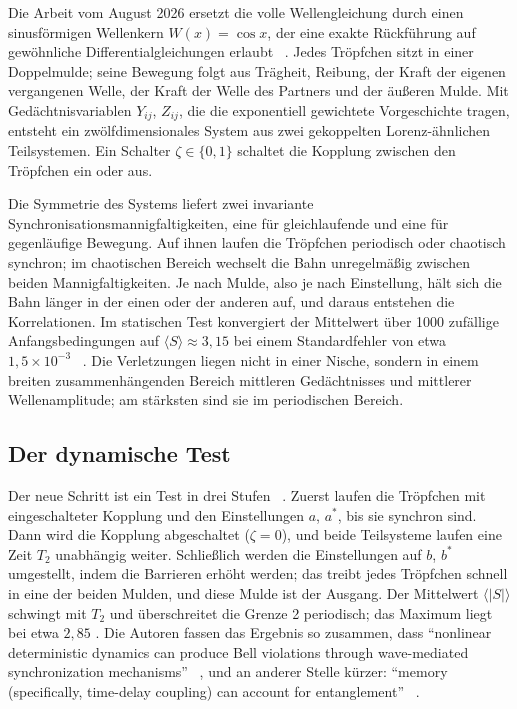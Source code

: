 Die Arbeit vom August 2026 ersetzt die volle Wellengleichung durch einen sinusförmigen Wellenkern
$W(x)=\cos x$, der eine exakte Rückführung auf gewöhnliche Differentialgleichungen erlaubt
\QM~\cite{Lopez2026}. Jedes Tröpfchen sitzt in einer Doppelmulde; seine Bewegung folgt aus Trägheit,
Reibung, der Kraft der eigenen vergangenen Welle, der Kraft der Welle des Partners und der äußeren
Mulde. Mit Gedächtnisvariablen $Y_{ij}$, $Z_{ij}$, die die exponentiell gewichtete Vorgeschichte
tragen, entsteht ein zwölfdimensionales System aus zwei gekoppelten Lorenz-ähnlichen Teilsystemen.
Ein Schalter $\zeta\in\{0,1\}$ schaltet die Kopplung zwischen den Tröpfchen ein oder aus.

Die Symmetrie des Systems liefert zwei invariante Synchronisationsmannigfaltigkeiten, eine für
gleichlaufende und eine für gegenläufige Bewegung. Auf ihnen laufen die Tröpfchen periodisch oder
chaotisch synchron; im chaotischen Bereich wechselt die Bahn unregelmäßig zwischen beiden
Mannigfaltigkeiten. Je nach Mulde, also je nach Einstellung, hält sich die Bahn länger in der einen
oder der anderen auf, und daraus entstehen die Korrelationen. Im statischen Test konvergiert der
Mittelwert über 1000 zufällige Anfangsbedingungen auf $\langle S\rangle\approx3{,}15$ bei einem
Standardfehler von etwa $1{,}5\times10^{-3}$ \QM~\cite{Lopez2026}. Die Verletzungen liegen nicht in
einer Nische, sondern in einem breiten zusammenhängenden Bereich mittleren Gedächtnisses und
mittlerer Wellenamplitude; am stärksten sind sie im periodischen Bereich.

\subsection{Der dynamische Test}

Der neue Schritt ist ein Test in drei Stufen \QM~\cite{Lopez2026}. Zuerst laufen die Tröpfchen mit
eingeschalteter Kopplung und den Einstellungen $a$, $a^*$, bis sie synchron sind. Dann wird die
Kopplung abgeschaltet ($\zeta=0$), und beide Teilsysteme laufen eine Zeit $T_2$ unabhängig weiter.
Schließlich werden die Einstellungen auf $b$, $b^*$ umgestellt, indem die Barrieren erhöht werden;
das treibt jedes Tröpfchen schnell in eine der beiden Mulden, und diese Mulde ist der Ausgang. Der
Mittelwert $\langle|S|\rangle$ schwingt mit $T_2$ und überschreitet die Grenze 2 periodisch; das
Maximum liegt bei etwa $2{,}85$ \QM. Die Autoren fassen das Ergebnis so zusammen, dass
\enquote{nonlinear deterministic dynamics can produce Bell violations through wave-mediated
synchronization mechanisms} \QM~\cite{Lopez2026}, und an anderer Stelle kürzer: \enquote{memory
(specifically, time-delay coupling) can account for entanglement} \QM~\cite{Lopez2026}.

